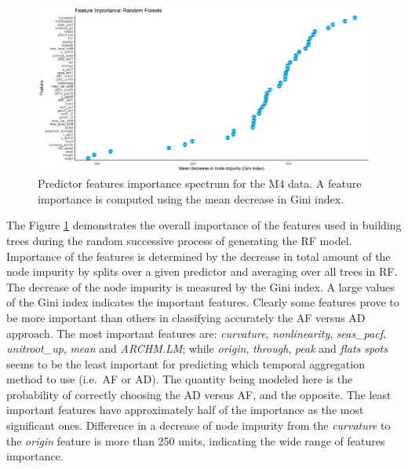 \documentclass[preprint, 3p,
authoryear]{elsarticle} %
\begin{document}
\begin{figure}[H]

{\centering \includegraphics[width=0.95\linewidth]{img/300dpi/Fig_importance} 

}

\caption{Predictor features importance spectrum for the M4 data. A feature importance is computed using the mean decrease in Gini index.}\label{fig:RFpartial}
\end{figure}

The Figure \ref{fig:RFpartial} demonstrates the overall importance of
the features used in building trees during the random successive process
of generating the RF model. Importance of the features is determined by
the decrease in total amount of the node impurity by splits over a given
predictor and averaging over all trees in RF. The decrease of the node
impurity is measured by the Gini index. A large values of the Gini index
indicates the important features. Clearly some features prove to be more
important than others in classifying accurately the AF versus AD
approach. The most important features are: \emph{curvature},
\emph{nonlinearity}, \emph{seas\_pacf}, \emph{unitroot\_up}, \emph{mean}
and \emph{ARCHM.LM}; while \emph{origin}, \emph{through}, \emph{peak}
and \emph{flats spots} seems to be the least important for predicting
which temporal aggregation method to use (i.e.~AF or AD). The quantity
being modeled here is the probability of correctly choosing the AD
versus AF, and the opposite. The least important features have
approximately half of the importance as the most significant ones.
Difference in a decrease of node impurity from the \emph{curvature} to
the \emph{origin} feature is more than 250 units, indicating the wide
range of features importance.
\end{document}

